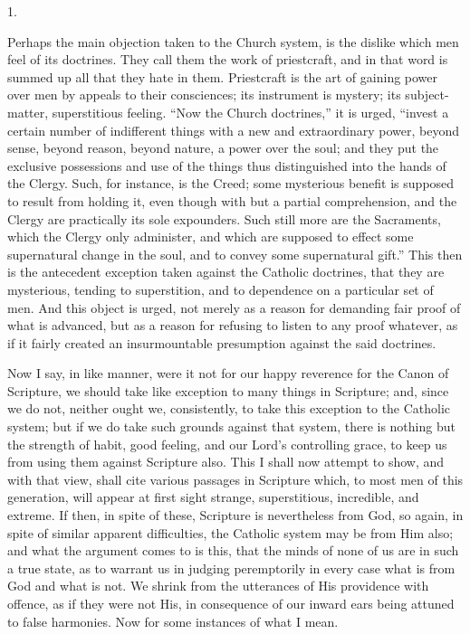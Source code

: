 1.

Perhaps the main objection taken to the Church system, is the
dislike which men feel of its doctrines. They call them the work of
priestcraft, and in that word is summed up all that they hate in them.
Priestcraft is the art of gaining power over men by appeals to their
consciences; its instrument is mystery; its subject-matter,
superstitious feeling. ``Now the Church doctrines,'' it is
urged, ``invest a certain number of indifferent things with a new
and extraordinary power, beyond sense, beyond reason, beyond nature, a
power over the soul; and they put the exclusive possessions and use of
the things thus distinguished into the hands of the Clergy. Such, for
instance, is the Creed; some mysterious benefit is supposed to
result from holding it, even though with but a partial comprehension,
and the Clergy are practically its sole expounders. Such still more
are the Sacraments, which the Clergy only administer, and which are
supposed to effect some supernatural change in the soul, and to convey
some supernatural gift.'' This then is the antecedent exception
taken against the Catholic doctrines, that they are mysterious,
tending to superstition, and to dependence on a particular set of men.
And this object is urged, not merely as a reason for demanding fair
proof of what is advanced, but as a reason for refusing to listen to
any proof whatever, as if it fairly created an insurmountable
presumption against the said doctrines.

Now I say, in like manner, were it not for our happy reverence for
the Canon of Scripture, we should take like exception to many things
in Scripture; and, since we do not, neither ought we, consistently, to
take this exception to the Catholic system; but if we do take such
grounds against that system, there is nothing but the strength of
habit, good feeling, and our Lord's controlling grace, to keep us from
using them against Scripture also. This I shall now attempt to show,
and with that view, shall cite various passages in Scripture which, to
most men of this generation, will appear at first sight strange,
superstitious, incredible, and extreme. If then, in spite of these,
Scripture is nevertheless from God, so again, in spite of similar
apparent difficulties, the Catholic system may be from Him also; and
what the argument comes to is this, that the minds of none of us are
in such a true state, as to warrant us in judging peremptorily in
every case what is from God and what is not. We shrink from the
utterances of His providence with offence, as if they were not His, in
consequence of our inward ears being attuned to false harmonies.
Now for some instances of what I mean.

